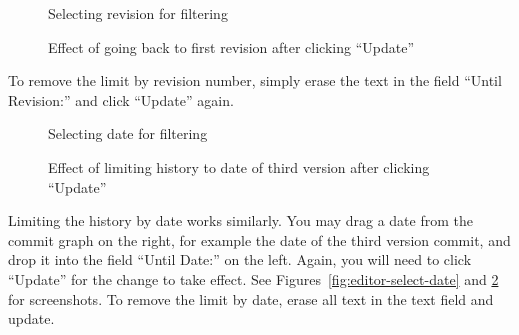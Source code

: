\begin{figure}
\centering
  \begin{minipage}[t]{0.28\linewidth}
  \centering
  \caption{Selecting revision for filtering} \label{fig:editor-select-rev}
  \end{minipage}%
\hspace{0.04\linewidth}%
  \begin{minipage}[t]{0.68\linewidth}
  \centering
  \caption{Effect of going back to first revision after clicking ``Update''} \label{fig:editor-limit-rev}
  \end{minipage}  
\end{figure}

To remove the limit by revision number, simply erase the text in the field ``Until Revision:'' and click ``Update'' again.

\begin{figure}
\centering
  \begin{minipage}[t]{0.28\linewidth}
  \centering
  \caption{Selecting date for filtering} \label{fig:editor-select-date}
  \end{minipage}%
\hspace{0.04\linewidth}%
  \begin{minipage}[t]{0.68\linewidth}
  \centering
  \caption{Effect of limiting history to date of third version after clicking ``Update''} \label{fig:editor-limit-date}
  \end{minipage}  
\end{figure}

Limiting the history by date works similarly.  You may drag a date from the commit graph on the right, for example the date of the third version commit, and drop it into the field ``Until Date:'' on the left.  %
Again, you will need to click ``Update'' for the change to take effect.  See Figures~\ref{fig:editor-select-date} and \ref{fig:editor-limit-date} for screenshots. To remove the limit by date, erase all text in the text field and update.

